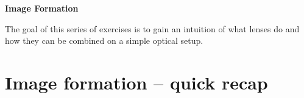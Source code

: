 \documentclass[a4paper]{report}
\begin{document}
	
	\setcounter{secnumdepth}{2}
	
	\begin{center}
		\textbf{\Large{Image Formation}}
	\end{center}
	
	\vspace{0.8cm}
	\noindent The goal of this series of exercises is to gain an intuition of what lenses do and how they can be combined on a simple optical setup. 
	

	

	\section{Image formation -- quick recap}
	\hypertarget{hintBack-recap}{}
    
\end{document}
